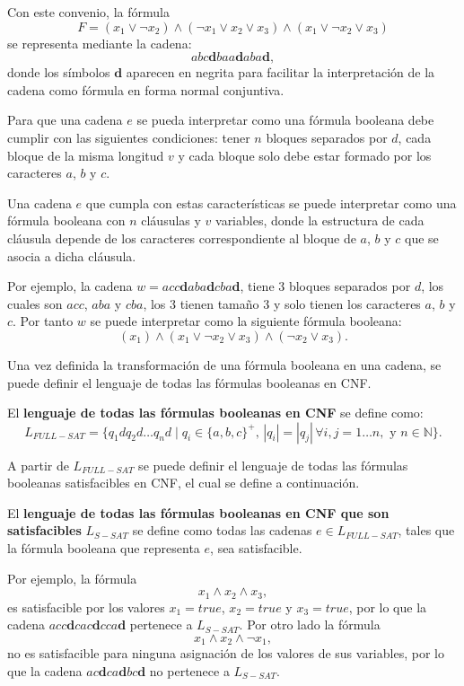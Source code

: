 Con este convenio, la fórmula
$$ F=(x_1 \vee \neg x_2) \wedge (\neg x_1 \vee x_2 \vee x_3) \wedge (x_1 \vee \neg x_2 \vee x_3)$$
se representa mediante la cadena:
$$abc\mathbf{d}baa\mathbf{d}aba\mathbf{d},$$
donde los símbolos $\mathbf{d}$ aparecen en negrita para facilitar la interpretación de la cadena como fórmula 
en forma normal conjuntiva.

Para que una cadena $e$ se pueda interpretar como una fórmula booleana debe cumplir con las siguientes condiciones:
tener $n$ bloques separados por $d$, cada bloque de la misma longitud $v$ y cada bloque solo debe estar formado por los caracteres
$a$, $b$ y $c$. 

Una cadena $e$ que cumpla con estas características  se puede interpretar como una fórmula booleana con $n$ cláusulas y $v$ variables, donde la estructura de cada cláusula depende de los caracteres correspondiente al bloque de $a$, $b$ y $c$ que se asocia a dicha cláusula.

Por ejemplo, la cadena $w=acc\mathbf{d}aba\mathbf{d}cba\mathbf{d}$, tiene 3 bloques separados por $d$, los cuales son $acc$, $aba$ y $cba$, los 3 tienen tamaño 3 y solo tienen los caracteres $a$, $b$ y $c$.
Por tanto  $w$ se puede interpretar como la siguiente fórmula booleana:
$$(x_1)\wedge(x_1\vee \neg x_2 \vee x_3) \wedge (\neg x_2\vee x_3).$$

Una vez definida la transformación de una fórmula booleana en una cadena, se puede definir el lenguaje de todas las fórmulas booleanas en CNF.

\begin{definition}
    El \textbf{lenguaje de todas las fórmulas booleanas en CNF} se define como:
    \[
        L_{FULL-SAT} = \{ q_1dq_2d\dots q_nd \mid q_i \in \{a, b,c\}^+\text{, }
        |q_i| = |q_j| \, \forall i, j =1\dots n, \text{ y } n\in \mathbb{N}\}.
    \]
\end{definition}

A partir de $L_{FULL-SAT}$ se puede definir el lenguaje de todas las fórmulas booleanas satisfacibles
en CNF, el cual se define a continuación.

\begin{definition}
    El \textbf{lenguaje de todas las fórmulas booleanas en CNF que son satisfacibles} $L_{S-SAT}$ se define como todas las cadenas $e\in L_{FULL-SAT}$,
    tales que la fórmula booleana que representa $e$, sea satisfacible.
\end{definition}

Por ejemplo, la fórmula $$x_1\wedge x_2 \wedge x_3,$$ es satisfacible por los valores $x_1=true$, $x_2=true$ y $x_3=true$, por lo que la 
cadena $acc\mathbf{d}cac\mathbf{d}cca\mathbf{d}$ pertenece a $L_{S-SAT}$. Por otro lado la fórmula $$x_1\wedge x_2 \wedge \neg x_1,$$
no es satisfacible para ninguna asignación de los valores de sus variables, por lo que la cadena $ac\mathbf{d}ca\mathbf{d}bc\mathbf{d}$
no pertenece a $L_{S-SAT}$.

